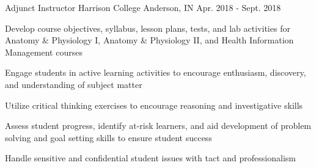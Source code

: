 \begin{cventries}
  \cventry
    {Adjunct Instructor}
    {Harrison College}
    {Anderson, IN}
    {Apr. 2018 - Sept. 2018}
    {
      \begin{cvitems}
      \item {Develop course objectives, syllabus, lesson plans, tests, and lab activities for Anatomy \& Physiology I, Anatomy \& Physiology II, and Health Information Management courses} 
        \item {Engage students in active learning activities to encourage enthusiasm, discovery, and understanding of subject matter}
        \item {Utilize critical thinking exercises to encourage reasoning and investigative skills}
        \item {Assess student progress, identify at-risk learners, and aid development of problem solving and goal setting skills to ensure student success}
        \item {Handle sensitive and confidential student issues with tact and professionalism}
  \end{cvitems}
    }


\end{cventries}
